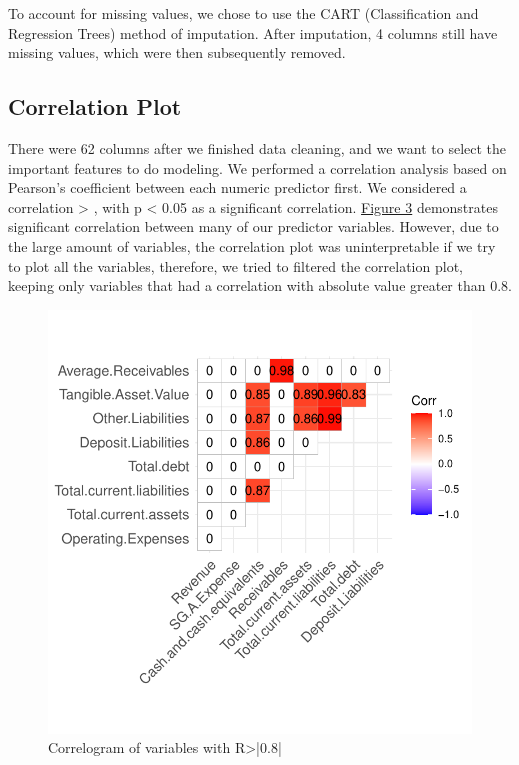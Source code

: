 \documentclass[11pt,]{article}
\begin{document}
To account for missing values, we chose to use the CART (Classification
and Regression Trees) method of imputation. After imputation, 4 columns
still have missing values, which were then subsequently removed.

\hypertarget{correlation-plot}{%
\subsection{Correlation Plot}\label{correlation-plot}}

There were 62 columns after we finished data cleaning, and we want to
select the important features to do modeling. We performed a correlation
analysis based on Pearson's coefficient between each numeric predictor
first. We considered a correlation \textgreater{} \textbar,
with p \textless{} 0.05 as a significant correlation.
\hyperref[sec:fig3]{Figure 3} demonstrates significant correlation
between many of our predictor variables. However, due to the large
amount of variables, the correlation plot was uninterpretable if we try
to plot all the variables, therefore, we tried to filtered the
correlation plot, keeping only variables that had a correlation with
absolute value greater than 0.8.

\begin{figure}

{\centering \includegraphics{stock_analysis_files/figure-latex/corrplot-1} 

}

\caption{Correlogram of variables with R>|0.8|}\label{fig:corrplot}
\end{figure}
\end{document}
